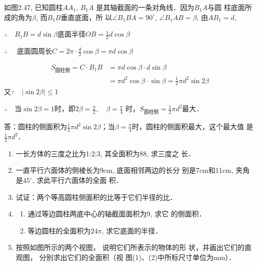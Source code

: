 \begin{solution}
    如图2.47, 已知圆柱$AA_1$, $B_1A$
    是其轴截面的一条对角线．因为$B_1A$与圆
    柱底面所成的角为$\beta$, 而$B_1B$垂直底面，所
    以$\angle B_1BA=90^{\circ}$, $\angle B_1AB=\beta$, 由$AB_1=d$,
    
$\therefore\quad B_1B=d\sin\beta$\quad 底面半径$OB=\frac{1}{2}d\cos\beta$

$\therefore\quad$ 底面圆周长$C=2\pi\cdot \frac{d}{2}\cos\beta=\pi d\cos\beta$

\[\begin{split}
    S_{\text{圆柱侧}}=C\cdot B_1B&=\pi d\cos\beta\cdot d\sin\beta\\ 
&=\pi d^2\cos\beta\cdot \sin\beta=\frac{1}{2}\pi d^2\sin2\beta
\end{split}\]
又$\because\quad |\sin2\beta|\le 1$

$\therefore\quad $当$\sin2\beta=1$时，即$2\beta=\frac{\pi}{2},\quad \beta=\frac{\pi}{4}$
时，$ S_{\text{圆柱侧}}=\frac{1}{2}\pi d^2$最大．

答：圆柱的侧面积为$\frac{1}{2}\pi d^2\sin2\beta$；当$\beta=\frac{\pi}{4}$时，圆柱的侧面积最大，这个最大值
是$\frac{1}{2}\pi d^2$．
\end{solution}

\begin{ex}
\begin{enumerate}
    \item 一长方体的三度之比为1:2:3, 其全面积为88, 求三度之
    长．
    \item 一直平行六面体的侧棱长为9cm, 底面相邻两边的长分
    别是7cm和11cm, 夹角是$45^{\circ}$, 求此平行六面体的全面
    积．
    \item 试证：两个等高圆柱侧面积的比等于它们半径的比．
    \item \begin{enumerate}
    \item 通过等边圆柱两底中心的轴截面面积为9, 求它
    的侧面积．
    \item 等边圆柱的全面积为$24\pi$, 
    求它底面的半径．
    \end{enumerate}

    \item 按照如图所示的两个视图，
    说明它们所表示的物体的形
    状，并画出它们的直观图，
    分别求出它们的全面积（视
    图(1)、(2)中所标尺寸单位为mm）．
\end{enumerate} 
\end{ex}

